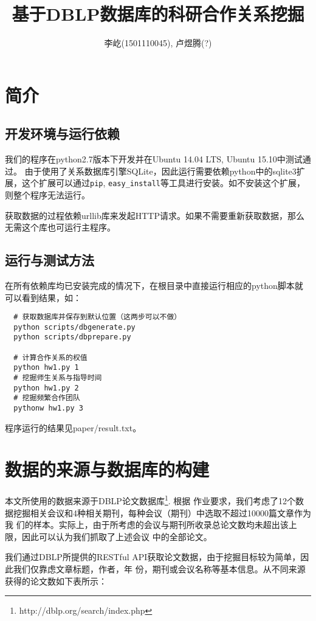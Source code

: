 \documentclass[a4paper]{article}
\title{基于DBLP数据库的科研合作关系挖掘}
\author{李屹(1501110045), 卢煜腾(?)}
\begin{document}
\maketitle

\section{简介} 
\subsection{开发环境与运行依赖}
我们的程序在python2.7版本下开发并在Ubuntu 14.04 LTS, Ubuntu 15.10中测试通过。
由于使用了关系数据库引擎SQLite，因此运行需要依赖python中的sqlite3扩展，这个扩展可以通过\texttt{pip},
\texttt{easy\_install}等工具进行安装。如不安装这个扩展，则整个程序无法运行。

获取数据的过程依赖urllib库来发起HTTP请求。如果不需要重新获取数据，那么无需这个库也可运行主程序。

\subsection{运行与测试方法}
在所有依赖库均已安装完成的情况下，在根目录中直接运行相应的python脚本就可以看到结果，如：
\begin{verbatim}
  # 获取数据库并保存到默认位置（这两步可以不做）
  python scripts/dbgenerate.py
  python scripts/dbprepare.py

  # 计算合作关系的权值
  python hw1.py 1
  # 挖掘师生关系与指导时间
  python hw1.py 2
  # 挖掘频繁合作团队
  pythonw hw1.py 3
\end{verbatim}
程序运行的结果见paper/result.txt。

\section{数据的来源与数据库的构建}
本文所使用的数据来源于DBLP论文数据库\footnote{http://dblp.org/search/index.php}. 根据
作业要求，我们考虑了12个数据挖掘相关会议和4种相关期刊，每种会议（期刊）中选取不超过10000篇文章作为我
们的样本。实际上，由于所考虑的会议与期刊所收录总论文数均未超出该上限，因此可以认为我们抓取了上述会议
中的全部论文。

我们通过DBLP所提供的RESTful API获取论文数据，由于挖掘目标较为简单，因此我们仅靠虑文章标题，作者，年
份，期刊或会议名称等基本信息。从不同来源获得的论文数如下表所示：
\end{document}

